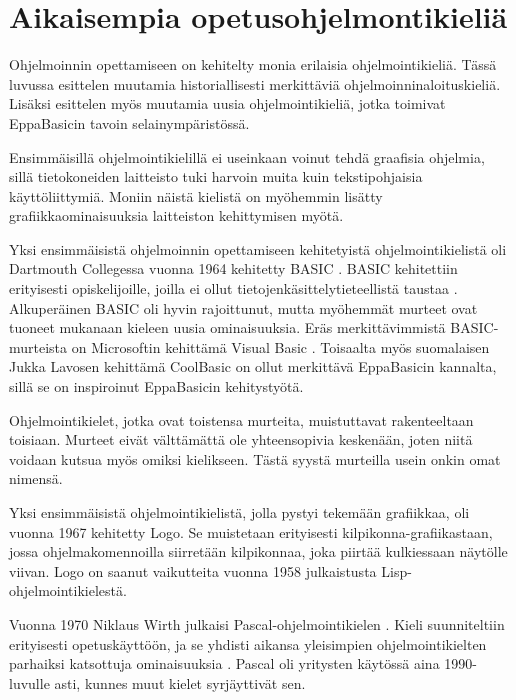 
\section{Aikaisempia opetusohjelmontikieliä}
Ohjelmoinnin opettamiseen on kehitelty
monia erilaisia ohjelmointikieliä.
Tässä luvussa esittelen muutamia
historiallisesti merkittäviä
ohjelmoinninaloituskieliä.
Lisäksi esittelen myös muutamia uusia
ohjelmointikieliä, jotka toimivat
EppaBasicin tavoin selainympäristössä.

Ensimmäisillä ohjelmointikielillä
ei useinkaan voinut tehdä graafisia
ohjelmia, sillä tietokoneiden
laitteisto tuki harvoin
muita kuin tekstipohjaisia
käyttöliittymiä.
Moniin näistä kielistä
on myöhemmin lisätty
grafiikkaominaisuuksia laitteiston
kehittymisen myötä.

Yksi ensimmäisistä ohjelmoinnin
opettamiseen kehitetyistä
ohjelmointikielistä oli
Dartmouth Collegessa vuonna 1964
kehitetty BASIC \cite{basic}.
BASIC kehitettiin erityisesti
opiskelijoille, joilla ei ollut
tietojenkäsittelytieteellistä
taustaa \cite{language_history}.
Alkuperäinen BASIC oli hyvin
rajoittunut, mutta myöhemmät
murteet ovat tuoneet mukanaan
kieleen uusia ominaisuuksia.
Eräs merkittävimmistä
BASIC-murteista on
Microsoftin kehittämä
Visual Basic \cite{vb.net}.
Toisaalta myös suomalaisen
Jukka Lavosen kehittämä
CoolBasic \cite{cb} on ollut merkittävä
EppaBasicin kannalta, sillä
se on inspiroinut EppaBasicin
kehitystyötä.

Ohjelmointikielet, jotka ovat
toistensa murteita,
muistuttavat rakenteeltaan
toisiaan.
Murteet eivät välttämättä
ole yhteensopivia keskenään,
joten niitä voidaan kutsua
myös omiksi kielikseen.
Tästä syystä murteilla
usein onkin omat nimensä.

Yksi ensimmäisistä ohjelmointikielistä,
jolla pystyi tekemään grafiikkaa,
oli vuonna 1967 kehitetty Logo.
Se muistetaan erityisesti
kilpikonna-grafiikastaan,
jossa ohjelmakomennoilla
siirretään kilpikonnaa,
joka piirtää kulkiessaan
näytölle viivan.
Logo on saanut vaikutteita vuonna 1958
julkaistusta Lisp-ohjelmointikielestä.

Vuonna 1970 Niklaus Wirth
julkaisi Pascal-ohjelmointikielen
\cite{pascal}.
Kieli suunniteltiin erityisesti
opetuskäyttöön, ja se yhdisti
aikansa yleisimpien ohjelmointikielten
parhaiksi katsottuja ominaisuuksia
\cite{language_history}.
Pascal oli yritysten käytössä aina
1990-luvulle asti, kunnes muut kielet
syrjäyttivät sen.

